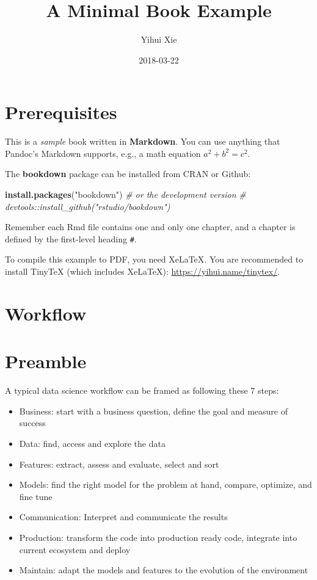 \documentclass[]{book}
\title{A Minimal Book Example}
\author{Yihui Xie}
\date{2018-03-22}
\newenvironment{Shaded}{\begin{snugshade}}{\end{snugshade}}
\newcommand{\KeywordTok}[1]{\textcolor[rgb]{0.13,0.29,0.53}{\textbf{#1}}}
\newcommand{\StringTok}[1]{\textcolor[rgb]{0.31,0.60,0.02}{#1}}
\newcommand{\CommentTok}[1]{\textcolor[rgb]{0.56,0.35,0.01}{\textit{#1}}}
\newcommand{\NormalTok}[1]{#1}
\theoremstyle{definition}
\theoremstyle{definition}
\theoremstyle{definition}
\theoremstyle{remark}
\begin{document}
\maketitle

{
\setcounter{tocdepth}{1}
\tableofcontents
}
\chapter{Prerequisites}\label{prerequisites}

This is a \emph{sample} book written in \textbf{Markdown}. You can use
anything that Pandoc's Markdown supports, e.g., a math equation
\(a^2 + b^2 = c^2\).

The \textbf{bookdown} package can be installed from CRAN or Github:

\begin{Shaded}
\begin{Highlighting}[]
\KeywordTok{install.packages}\NormalTok{(}\StringTok{"bookdown"}\NormalTok{)}
\CommentTok{# or the development version}
\CommentTok{# devtools::install_github("rstudio/bookdown")}
\end{Highlighting}
\end{Shaded}

Remember each Rmd file contains one and only one chapter, and a chapter
is defined by the first-level heading \texttt{\#}.

To compile this example to PDF, you need XeLaTeX. You are recommended to
install TinyTeX (which includes XeLaTeX):
\url{https://yihui.name/tinytex/}.

\chapter{Workflow}\label{workflow}

\chapter{Preamble}\label{preamble}

A typical data science workflow can be framed as following these 7
steps:

\begin{itemize}
\item
  Business: start with a business question, define the goal and measure
  of success
\item
  Data: find, access and explore the data
\item
  Features: extract, assess and evaluate, select and sort
\item
  Models: find the right model for the problem at hand, compare,
  optimize, and fine tune
\item
  Communication: Interpret and communicate the results
\item
  Production: transform the code into production ready code, integrate
  into current ecosystem and deploy
\item
  Maintain: adapt the models and features to the evolution of the
  environment
\end{itemize}
\end{document}
